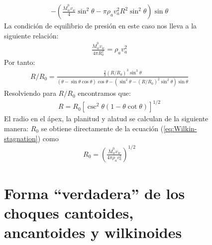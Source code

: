 \begin{figure}
\begin{align}
{  - \left(\frac{\dot{M}^0_w v_w}{4}\sin^2\theta - \pi\rho_a v^2_a R^2 \sin^2\theta\right)\sin\theta}
\end{align}
\normalsize
La condición de equilibrio de presión en este caso nos lleva a la siguiente relación:
\begin{align}
  \frac{\dot{M}^0_w v_w}{4\pi R^2_0} = \rho_a v^2_a \label{eq:Wilkin-stagnation}
\end{align}
Por tanto:
\begin{align}
  R/R_0 = \frac{\frac{2}{3}\left(R/R_0\right)^3 \sin^3\theta}{\left(\theta-\sin\theta\cos\theta\right)\cos\theta
  - \left(\sin^2\theta - \left(R/R_0\right)^2 \sin^2\theta\right)\sin\theta}
\end{align}
Resolviendo para $R/R_0$ encontramos que:
\begin{align}
  R = R_0\left[\csc^2\theta\left(1 - \theta\cot\theta\right)\right]^{1/2} \label{eq:R-Wilkin}
\end{align}
El radio en el ápex, la planitud y alatud se calculan de la siguiente manera:
$R_0$ se obtiene directamente de la ecuación (\ref{eq:Wilkin-stagnation}) como
\begin{align}
  R_0 = \left(\frac{\dot{M}^0_w v_w}{4\pi \rho_a v^2_a}\right)^{1/2}
\end{align}


\section{Forma ``verdadera'' de los choques cantoides, ancantoides y wilkinoides}


\end{figure}
